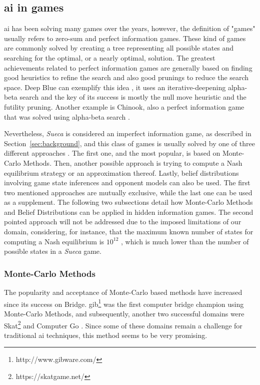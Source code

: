 \subsection{\ac{ai} in games}
 
\ac{ai} has been solving many games over the years, however, the definition of "games" usually refers to zero-sum and perfect information games.
These kind of games are commonly solved by creating a tree representing all possible states and searching for the optimal, or a nearly optimal, solution.
The greatest achievements related to perfect information games are generally based on finding good heuristics to refine the search and also good prunings to reduce the search space.
Deep Blue can exemplify this idea \cite{Campbell2002}, it uses an iterative-deepening alpha-beta search and the key of its success is mostly the null move heuristic and the futility pruning.
Another example is Chinook, also a perfect information game that was solved using alpha-beta search \cite{Schaeffer1996}.

Nevertheless, \emph{Sueca} is considered an imperfect information game, as described in Section~\ref{sec:background}, and this class of games is usually solved by one of three different approaches \cite{Cowling2012}.
The first one, and the most popular, is based on Monte-Carlo Methods.
Then, another possible approach is trying to compute a Nash equilibrium strategy or an approximation thereof.
Lastly, belief distributions involving game state inferences and opponent models can also be used.
The first two mentioned approaches are mutually exclusive, while the last one can be used as a supplement.
The following two subsections detail how Monte-Carlo Methods and Belief Distributions can be applied in hidden information games.
The second pointed approach will not be addressed due to the imposed limitations of our domain, considering, for instance, that the maximum known number of states for computing a Nash equilibrium is $10^{12}$ \cite{Zinkevich}, which is much lower than the number of possible states in a \emph{Sueca} game.




\subsubsection{Monte-Carlo Methods}

The popularity and acceptance of Monte-Carlo based methods have increased since its success on Bridge.
\ac{gib}\footnote{http://www.gibware.com/} was the first computer bridge champion using Monte-Carlo Methods, and subsequently, another two successful domains were Skat\footnote{https://skatgame.net/} and Computer Go \cite{Gelly2011}.
Since some of these domains remain a challenge for traditional \ac{ai} techniques, this method seems to be very promising.


